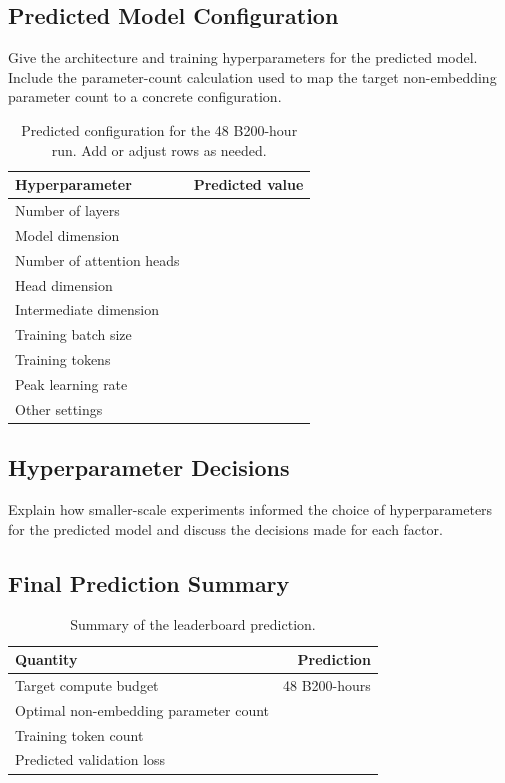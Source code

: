 \subsection{Predicted Model Configuration}
Give the architecture and training hyperparameters for the predicted model. Include the parameter-count calculation used to map the target non-embedding parameter count to a concrete configuration.
\begin{table}[htbp]
\centering\small
\begin{tabular}{@{}ll@{}}
\toprule
Hyperparameter & Predicted value \\
\midrule
Number of layers & \\
Model dimension & \\
Number of attention heads & \\
Head dimension & \\
Intermediate dimension & \\
Training batch size & \\
Training tokens & \\
Peak learning rate & \\
Other settings & \\
\bottomrule
\end{tabular}
\caption{Predicted configuration for the 48 B200-hour run. Add or adjust rows as needed.}
\label{tab:predicted-config}
\end{table}
\answer

\subsection{Hyperparameter Decisions}
Explain how smaller-scale experiments informed the choice of hyperparameters for the predicted model and discuss the decisions made for each factor.
\answer

\subsection{Final Prediction Summary}
\begin{table}[htbp]
\centering\small
\begin{tabular}{@{}lr@{}}
\toprule
Quantity & Prediction \\
\midrule
Target compute budget & 48 B200-hours \\
Optimal non-embedding parameter count & \\
Training token count & \\
Predicted validation loss & \\
\bottomrule
\end{tabular}
\caption{Summary of the leaderboard prediction.}
\label{tab:leaderboard-prediction}
\end{table}
\answer
